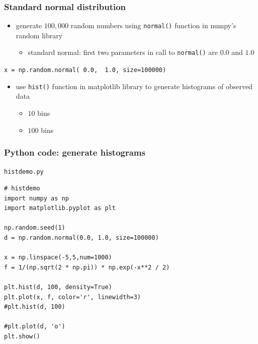 \documentclass[english,14pt]{beamer}
\newcommand\red[1]{{\color{red} #1}}
\newcommand\blue[1]{{\color{blue} #1}}
\begin{document}
\begin{frame}[fragile]

\frametitle{Standard normal distribution}

\begin{itemize}
	\item generate $100,000$ random numbers using \texttt{normal()} function in numpy's random library
	\begin{itemize}
		\item standard normal: first two parameters in call to \texttt{normal()} are $0.0$ and $1.0$
	\end{itemize}
\end{itemize}

{\small
	\texttt{x = np.random.normal(\red{0.0}, \blue{1.0}, size=100000)}
}

\vspace*{5mm}

\begin{itemize}
	\item use \texttt{hist()} function in matplotlib library to generate histograms of observed data
	\begin{itemize}
		\item $10$ bins
		\item $100$ bins
	\end{itemize}
\end{itemize}


\end{frame}


\begin{frame}[fragile]

\frametitle{Python code: generate histograms}

\texttt{histdemo.py}
\begin{lstlisting}[style=CStyle,basicstyle=\scriptsize]
# histdemo
import numpy as np
import matplotlib.pyplot as plt

np.random.seed(1)
d = np.random.normal(0.0, 1.0, size=100000)

x = np.linspace(-5,5,num=1000)
f = 1/(np.sqrt(2 * np.pi)) * np.exp(-x**2 / 2)

plt.hist(d, 100, density=True)
plt.plot(x, f, color='r', linewidth=3)
#plt.hist(d, 100)

#plt.plot(d, 'o')
plt.show()
\end{lstlisting}

\end{frame}
\end{document}
